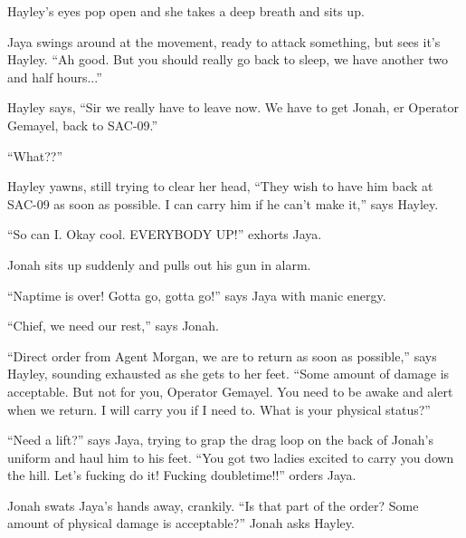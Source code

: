 
  {\color[RGB]{255,153,0} } 


  {\color[RGB]{255,153,0} } 

Hayley's eyes pop open and she takes a deep breath and sits up.

Jaya swings around at the movement, ready to attack something, but sees it's Hayley.  ``Ah good. But you should really go back to sleep, we have another two and half hours...''

Hayley says, ``Sir we really have to leave now.  We have to get Jonah, er Operator Gemayel, back to SAC-09.''

``What??''

Hayley yawns, still trying to clear her head, ``They wish to have him back at SAC-09 as soon as possible.  I can carry him if he can't make it,'' says Hayley.

``So can I.  Okay cool.  EVERYBODY UP!'' exhorts Jaya.

Jonah sits up suddenly and pulls out his gun in alarm.

``Naptime is over!  Gotta go, gotta go!'' says Jaya with manic energy.

``Chief, we need our rest,'' says Jonah.

``Direct order from Agent Morgan, we are to return as soon as possible,'' says Hayley, sounding exhausted as she gets to her feet.  ``Some amount of damage is acceptable.  But not for you, Operator Gemayel.  You need to be awake and alert when we return.  I will carry you if I need to.  What is your physical status?''

``Need a lift?'' says Jaya, trying to grap the drag loop on the back of Jonah's uniform and haul him to his feet.  ``You got two ladies excited to carry you down the hill.  Let's fucking do it!   Fucking doubletime!!'' orders Jaya.

Jonah swats Jaya's hands away, crankily.   ``Is that part of the order?  Some amount of physical damage is acceptable?'' Jonah asks Hayley.



